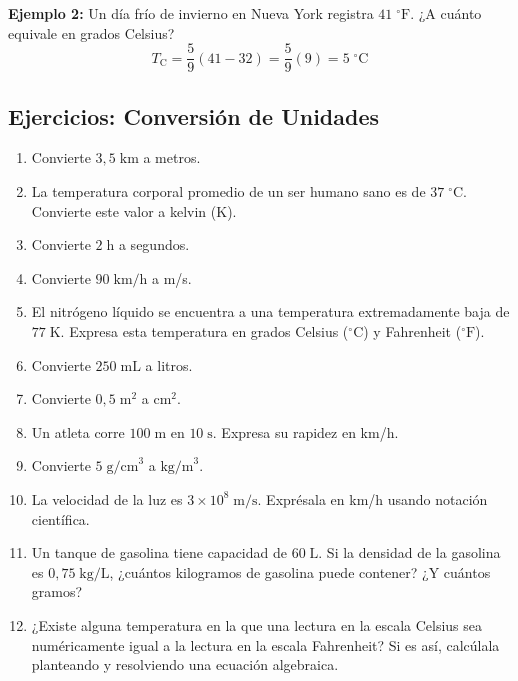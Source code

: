 \documentclass[12pt, a4paper]{article}
\begin{document}
\noindent\textbf{Ejemplo 2:} Un día frío de invierno en Nueva York registra $41\;^\circ\text{F}$. ¿A cuánto equivale en grados Celsius?
$$T_{\text{C}} = \frac{5}{9}(41 - 32) = \frac{5}{9}(9) = 5\;^\circ\text{C}$$

\newpage

\subsection{Ejercicios: Conversión de Unidades}

\begin{enumerate}[leftmargin=*, resume]
  \item \facil{} Convierte $3{,}5\;\text{km}$ a metros.

  \item \facil{} La temperatura corporal promedio de un ser humano sano es de $37\;^\circ\text{C}$. Convierte este valor a kelvin (K).

  \item \facil{} Convierte $2\;\text{h}$ a segundos.

  \item \facil{} Convierte $90\;\text{km/h}$ a m/s.

  \item \medio{} El nitrógeno líquido se encuentra a una temperatura extremadamente baja de $77\;\text{K}$. Expresa esta temperatura en grados Celsius ($^\circ\text{C}$) y Fahrenheit ($^\circ\text{F}$).

  \item \medio{} Convierte $250\;\text{mL}$ a litros.

  \item \medio{} Convierte $0{,}5\;\text{m}^2$ a $\text{cm}^2$.

  \item \medio{} Un atleta corre $100\;\text{m}$ en $10\;\text{s}$. Expresa su rapidez en km/h.

  \item \dificil{} Convierte $5\;\text{g/cm}^3$ a $\text{kg/m}^3$.

  \item \dificil{} La velocidad de la luz es $3 \times 10^8\;\text{m/s}$. Exprésala en km/h usando notación científica.

  \item \dificil{} Un tanque de gasolina tiene capacidad de $60\;\text{L}$. Si la densidad de la gasolina es $0{,}75\;\text{kg/L}$, ¿cuántos kilogramos de gasolina puede contener? ¿Y cuántos gramos?

  \item \dificil{} ¿Existe alguna temperatura en la que una lectura en la escala Celsius sea numéricamente igual a la lectura en la escala Fahrenheit? Si es así, calcúlala planteando y resolviendo una ecuación algebraica.
\end{enumerate}
\end{document}
